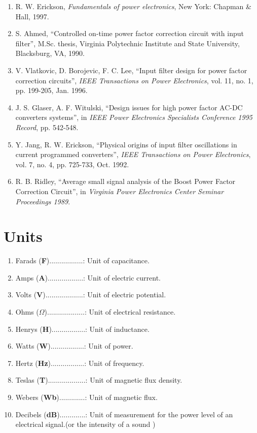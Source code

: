 \documentclass{article}
\begin{document}
\begin{enumerate}
    
    \item R. W. Erickson, \textit{Fundamentals of power electronics}, New York: Chapman \& Hall, 1997.
    \item S. Ahmed, “Controlled on-time power factor correction circuit with input filter”, M.Sc. thesis, Virginia Polytechnic Institute and State University, Blacksburg, VA, 1990.
    \item V. Vlatkovic, D. Borojevic, F. C. Lee, “Input filter design for power factor correction circuits”, \textit{IEEE Transactions on Power Electronics}, vol. 11, no. 1, pp. 199-205, Jan. 1996.
    \item J. S. Glaser, A. F. Witulski, “Design issues for high power factor AC-DC converters systems”, in \textit{IEEE Power Electronics Specialists Conference 1995 Record}, pp. 542-548.
    \item Y. Jang, R. W. Erickson, “Physical origins of input filter oscillations in current programmed converters”, \textit{IEEE Transactions on Power Electronics}, vol. 7, no. 4, pp. 725-733, Oct. 1992.
    \item R. B. Ridley, “Average small signal analysis of the Boost Power Factor Correction Circuit”, in \textit{Virginia Power Electronics Center Seminar Proceedings 1989}.
\end{enumerate}
\section{Units}

\begin{enumerate}
    \item Farads (\textbf{F}).................: Unit of capacitance.
    \item Amps (\textbf{A})..................: Unit of electric current.
    \item Volts (\textbf{V})...................: Unit of electric potential.
    \item Ohms (\textbf{$\Omega$})...................: Unit of electrical resistance.
    \item Henrys (\textbf{H}).................: Unit of inductance.
    \item Watts (\textbf{W}).................: Unit of power.
    \item Hertz (\textbf{Hz}).................: Unit of frequency.
    \item Teslas (\textbf{T})...................: Unit of magnetic flux density.
    \item Webers (\textbf{Wb}).............: Unit of magnetic flux.
    \item Decibels (\textbf{dB}).............: Unit of measurement for the power level of an electrical signal.(or the intensity of a sound )
\end{enumerate}
\end{document}

